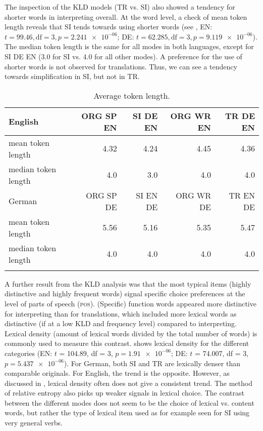 \documentclass[output=paper,colorlinks,citecolor=brown]{langscibook}
\begin{document}
The inspection of the KLD models (TR vs. SI) also showed a tendency for shorter words in interpreting overall. At the word level, a check of mean token length reveals that SI tends towards using shorter words (see , EN: $t = 99.46,\allowbreak \text{df} = 3,\allowbreak p = \num{2.241e-06}$; DE: $t = 62.285,\allowbreak \text{df} = 3,\allowbreak p = \num{9.119e-06}$). The median token length is the same for all modes in both languages, except for SI DE EN (3.0 for SI vs. 4.0 for all other modes). A preference for the use of shorter words is not observed for translations. Thus, we can see a tendency towards simplification in SI, but not in TR.

\begin{table}
\begin{tabular}{lrrrr}
\lsptoprule
English & ORG SP EN & SI DE EN & ORG WR EN & TR DE EN \\\midrule
mean token length & 4.32  & 4.24 & 4.45 & 4.36 \\
median token length & 4.0 & 3.0 & 4.0 & 4.0 \\\midrule
German & ORG SP DE & SI EN DE & ORG WR DE & TR EN DE \\\midrule
mean token length & 5.56 & 5.16 & 5.35 & 5.47 \\
median token length & 4.0 & 4.0 & 4.0 & 4.0\\
\lspbottomrule
\end{tabular}
\caption{\label{tab:token length} Average token length.}
\end{table}


A further result from the KLD analysis was that the most typical items (highly distinctive and highly frequent words) signal specific choice preferences at the level of parts of speech (\textsc{pos}). (Specific) function words appeared more distinctive for interpreting than for translations, which included more lexical words as distinctive (if at a low KLD and frequency level) compared to interpreting.  Lexical density (amount of lexical words divided by the total number of words) is commonly used to measure this contrast.  shows lexical density for the different categories (EN: $t$ = 104.89, df = 3, $p = \num{1.91e-06}$; DE: $t$ = 74.007, df = 3, $p = \num{5.437e-06}$). For German, both SI and TR are lexically denser than comparable originals. For English, the trend is the opposite. However, as discussed in , lexical density often does not give a consistent trend. The method of relative entropy also picks up weaker signals in lexical choice. The contrast between the different modes does not seem to be the choice of lexical vs. content words, but rather the type of lexical item used as for example seen for SI using very general verbs.
\end{document}
